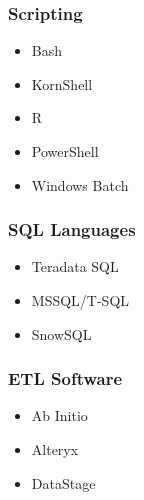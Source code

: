 \documentclass[letterpaper]{article}
\begin{document}
\begin{fullwidth}[width=\linewidth+2cm]
\begin{minipage}[t]{0.25\linewidth}
\begin{tcolorbox}[breakable, capture=minipage, title=Skills]
  \subsubsection*{Scripting}%
  \begin{itemize}
  \item Bash
  \item KornShell
  \item R %
  \item PowerShell
  \item Windows Batch
  \end{itemize}

  \subsubsection*{SQL Languages}
  \begin{itemize}
  \item Teradata SQL
  \item MSSQL/T-SQL %
  \item SnowSQL
  \end{itemize}
  
    \subsubsection*{ETL Software}%
    \begin{itemize} %
    \item Ab Initio
      \item Alteryx
    \item DataStage
    \end{itemize}

\end{tcolorbox}
\end{minipage}
\end{fullwidth}
\end{document}
